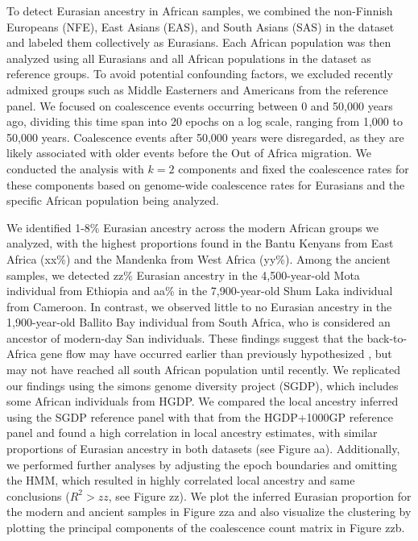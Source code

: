 To detect Eurasian ancestry in African samples, we combined the non-Finnish Europeans (NFE), East Asians (EAS), and South Asians (SAS) in the dataset and labeled them collectively as Eurasians. Each African population was then analyzed using all Eurasians and all African populations in the dataset as reference groups. To avoid potential confounding factors, we excluded recently admixed groups such as Middle Easterners and Americans from the reference panel. We focused on coalescence events occurring between 0 and 50,000 years ago, dividing this time span into 20 epochs on a log scale, ranging from 1,000 to 50,000 years. Coalescence events after 50,000 years were disregarded, as they are likely associated with older events before the Out of Africa migration. We conducted the analysis with $k=2$ components and fixed the coalescence rates for these components based on genome-wide coalescence rates for Eurasians and the specific African population being analyzed.

We identified 1-8\% Eurasian ancestry across the modern African groups we analyzed, with the highest proportions found in the Bantu Kenyans from East Africa (xx\%) and the Mandenka from West Africa (yy\%). Among the ancient samples, we detected zz\% Eurasian ancestry in the 4,500-year-old Mota individual from Ethiopia and aa\% in the 7,900-year-old Shum Laka individual from Cameroon. In contrast, we observed little to no Eurasian ancestry in the 1,900-year-old Ballito Bay individual from South Africa, who is considered an ancestor of modern-day San individuals. These findings suggest that the back-to-Africa gene flow may have occurred earlier than previously hypothesized \cite{pickrell2012genetic,llorente2015ancient}, but may not have reached all south African population until recently. We replicated our findings using the simons genome diversity project (SGDP), which includes some African individuals from HGDP. We compared the local ancestry inferred using the SGDP reference panel with that from the HGDP+1000GP reference panel and found a high correlation in local ancestry estimates, with similar proportions of Eurasian ancestry in both datasets (see Figure aa). Additionally, we performed further analyses by adjusting the epoch boundaries and omitting the HMM, which resulted in highly correlated local ancestry and same conclusions  ($R^2 > zz$, see Figure zz). We plot the inferred Eurasian proportion for the modern and ancient samples in Figure zza and also visualize the clustering by plotting the principal components of the coalescence count matrix in Figure zzb. 


